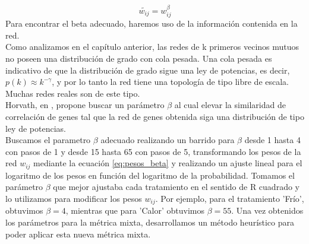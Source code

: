 \begin{equation}
	\tilde{w_{ij}} = w_{ij}^{\beta}
	\label{eq:pesos_beta}
\end{equation}
Para encontrar el beta adecuado, haremos uso de la información contenida en la red.\\
Como analizamos en el capítulo anterior, las redes de k primeros vecinos mutuos no poseen una distribución de grado con cola pesada. Una cola pesada es indicativo de que la distribución de grado sigue una ley de potencias, es decir, $p(k) \approx k^{-\gamma}$, y por lo tanto la red tiene una topología de tipo libre de escala. Muchas redes reales son de este tipo.\\
Horvath, en \cite{Horvath2005}, propone buscar un parámetro $\beta$ al cual elevar la similaridad de correlación de genes tal que la red de genes obtenida siga una distribución de tipo ley de potencias.\\
Buscamos el parametro $\beta$ adecuado realizando un barrido para $\beta$ desde 1 hasta 4 con pasos de 1 y desde 15 hasta 65 con pasos de 5, transformando los pesos de la red $w_{ij}$ mediante la ecuación \ref{eq:pesos_beta} y realizando un ajuste lineal para el logaritmo de los pesos en función del logaritmo de la probabilidad. Tomamos el parámetro $\beta$ que mejor ajustaba cada tratamiento en el sentido de R cuadrado y lo utilizamos para modificar los pesos $w_{ij}$. Por ejemplo, para el tratamiento 'Frío', obtuvimos $\beta=4$, mientras que para 'Calor' obtuvimos $\beta=55$.
Una vez obtenidos los parámetros para la métrica mixta, desarrollamos un método heurístico para poder aplicar esta nueva métrica mixta.
